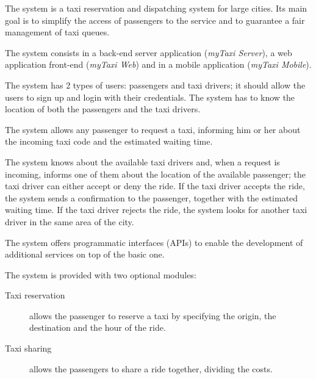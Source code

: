 The system is a taxi reservation and dispatching system for large cities. Its main goal is to simplify the access of passengers to the service and to guarantee a fair management of taxi queues.

The system consists in a back-end server application (\emph{myTaxi Server}), a web application front-end (\emph{myTaxi Web}) and in a mobile application (\emph{myTaxi Mobile}).

The system has 2 types of users: passengers and taxi drivers; it should allow the users to sign up and login with their credentials.
The system has to know the location of both the passengers and the taxi drivers.

The system allows any passenger to request a taxi, informing him or her about the incoming taxi code and the estimated waiting time.

The system knows about the available taxi drivers and, when a request is incoming, informs one of them about the location of the available passenger; the taxi driver can either accept or deny the ride.
If the taxi driver accepts the ride, the system sends a confirmation to the passenger, together with the estimated waiting time.
If the taxi driver rejects the ride, the system looks for another taxi driver in the same area of the city.

The system offers programmatic interfaces (APIs) to enable the development of additional services on top of the basic one.

The system is provided with two optional modules:
\begin{description}
\item[Taxi reservation] allows the passenger to reserve a taxi by specifying the origin, the destination and the hour of the ride.
\item[Taxi sharing] allows the passengers to share a ride together, dividing the costs.
\end{description}
